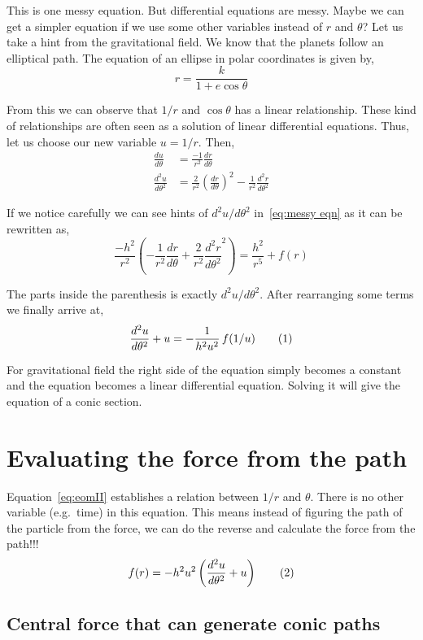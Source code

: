 \documentclass[a4paper, 12pt]{article}
\renewcommand{\indent}{\hspace{3ex}}
\newcommand\labelthis[1]{\addtocounter{equation}{1}\tag{\theequation}\label{#1}}
\newcommand{\ddth}[1]{\frac{d#1}{d\theta}}
\newcommand{\ddthII}[1]{\frac{d^2#1}{d\theta^2}}
\begin{document}
\medskip
This is one messy equation. But differential equations are messy. Maybe we can get a simpler equation if we use some other variables instead of $r$ and $\theta$?
Let us take a hint from the gravitational field. We know that the planets follow an elliptical path.  The equation of an ellipse in polar coordinates is given by,
\[ r = \frac{k}{1 + e \cos{\theta}} \]

From this we can observe that $1/r$ and $\cos{\theta}$ has a linear relationship. These kind of relationships are often seen as a solution of linear differential equations. Thus, let us choose our new variable $u = 1/r$. Then,
\begin{align*}
	\ddth{u} 	&= \frac{-1}{r^2} \ddth{r} \\
	\ddthII{u}  &= \frac{2}{r^2} {\left( \ddth{r} \right)}^2 - \frac{1}{r^2} \ddthII{r}
\end{align*}

If we notice carefully we can see hints of ${d^2 u}/{{d\theta}^2}$ in~\eqref{eq:messy eqn} as it can be rewritten as,
\[ \frac{-h^2}{r^2} \left( - \frac{1}{r^2} \ddth{r} + \frac{2}{r^2} \ddthII{r}^2 \right)
	= \frac{h^2}{r^5} + f(r) \]

	The parts inside the parenthesis is exactly ${d^2 u}/{{d\theta}^2}$. After rearranging some terms we finally arrive at,
\[ \ddthII{u} + u = - \frac{1}{h^2 u^2} \, f(1/u) \labelthis{eq:eomII} \]

For gravitational field the right side of the equation simply becomes a constant and the equation becomes a linear differential equation. Solving it will give the equation of a conic section.

\section{Evaluating the force from the path}\label{force from path}

\indent Equation~\eqref{eq:eomII} establishes a relation between $1/r$ and $\theta$. There is no other variable (e.g.\ time) in this equation. This means instead of figuring the path of the particle from the force, we can do the reverse and calculate the force from the path!!!
\[ f(r) = - h^2 u^2 \left( \ddthII{u} + u \right) \labelthis{eq:force from path} \]

\subsection{Central force that can generate conic paths}\label{force for conics}
\end{document}
